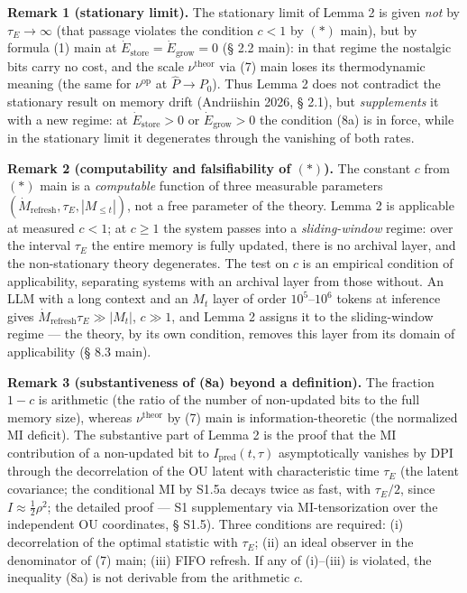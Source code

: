 \documentclass[pdflatex,sn-mathphys-ay]{sn-jnl}
\begin{document}
\textbf{Remark 1 (stationary limit).} The stationary limit of Lemma 2 is given \emph{not} by \(\tau_E \to \infty\) (that passage violates the condition \(c < 1\) by \((*)\) main), but by formula (1) main at \(\dot{E}_{\text{store}} = \dot{E}_{\text{grow}} = 0\) (§ 2.2 main): in that regime the nostalgic bits carry no cost, and the scale \(\nu^{\text{theor}}\) via (7) main loses its thermodynamic meaning (the same for \(\nu^{\text{op}}\) at \(\hat P \to P_0\)). Thus Lemma 2 does not contradict the stationary result on memory drift (Andriishin 2026, § 2.1), but \emph{supplements} it with a new regime: at \(\dot E_{\text{store}} > 0\) or \(\dot E_{\text{grow}} > 0\) the condition (8a) is in force, while in the stationary limit it degenerates through the vanishing of both rates.



\textbf{Remark 2 (computability and falsifiability of \((*)\)).} The constant \(c\) from \((*)\) main is a \emph{computable} function of three measurable parameters \((\dot{M}_{\text{refresh}}, \tau_E, |M_{\le t}|)\), not a free parameter of the theory. Lemma 2 is applicable at measured \(c < 1\); at \(c \ge 1\) the system passes into a \emph{sliding-window} regime: over the interval \(\tau_E\) the entire memory is fully updated, there is no archival layer, and the non-stationary theory degenerates. The test on \(c\) is an empirical condition of applicability, separating systems with an archival layer from those without. An LLM with a long context and an \(M_t\) layer of order \(10^5\)--\(10^6\) tokens at inference gives \(\dot{M}_{\text{refresh}} \tau_E \gg |M_t|\), \(c \gg 1\), and Lemma 2 assigns it to the sliding-window regime --- the theory, by its own condition, removes this layer from its domain of applicability (§ 8.3 main).



\textbf{Remark 3 (substantiveness of (8a) beyond a definition).} The fraction \(1-c\) is arithmetic (the ratio of the number of non-updated bits to the full memory size), whereas \(\nu^{\text{theor}}\) by (7) main is information-theoretic (the normalized MI deficit). The substantive part of Lemma 2 is the proof that the MI contribution of a non-updated bit to \(I_{\text{pred}}(t,\tau)\) asymptotically vanishes by DPI through the decorrelation of the OU latent with characteristic time \(\tau_E\) (the latent covariance; the conditional MI by S1.5a decays twice as fast, with \(\tau_E/2\), since \(I \approx \tfrac{1}{2}\rho^2\); the detailed proof --- S1 supplementary via MI-tensorization over the independent OU coordinates, § S1.5). Three conditions are required: (i) decorrelation of the optimal statistic with \(\tau_E\); (ii) an ideal observer in the denominator of (7) main; (iii) FIFO refresh. If any of (i)--(iii) is violated, the inequality (8a) is not derivable from the arithmetic \(c\).
\end{document}
